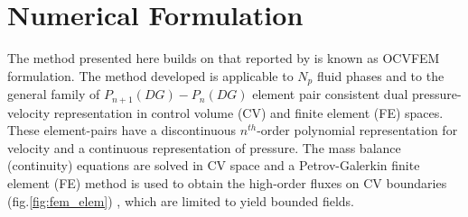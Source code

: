 \documentclass[preprint,authoryear,12pt]{elsarticle}
\begin{document}

\section{Numerical Formulation}\label{section:NumericalFormulation}
The method presented here builds on that reported by \citet{jackson_2015} is known as OCVFEM formulation. The method developed is applicable to $N_{p}$ fluid phases and to the general family of $P_{n+1}(DG)-P_{n}(DG)$ element pair consistent dual pressure-velocity representation in control volume (CV) and finite element (FE) spaces. These element-pairs have a discontinuous $n^{th}$-order polynomial representation for velocity and a continuous representation of pressure. The mass balance (continuity) equations are solved in CV space and a Petrov-Galerkin finite element (FE) method is used to obtain the high-order fluxes on CV boundaries (fig.\ref{fig:fem_elem})  , which are limited to yield bounded fields.
\end{document}
